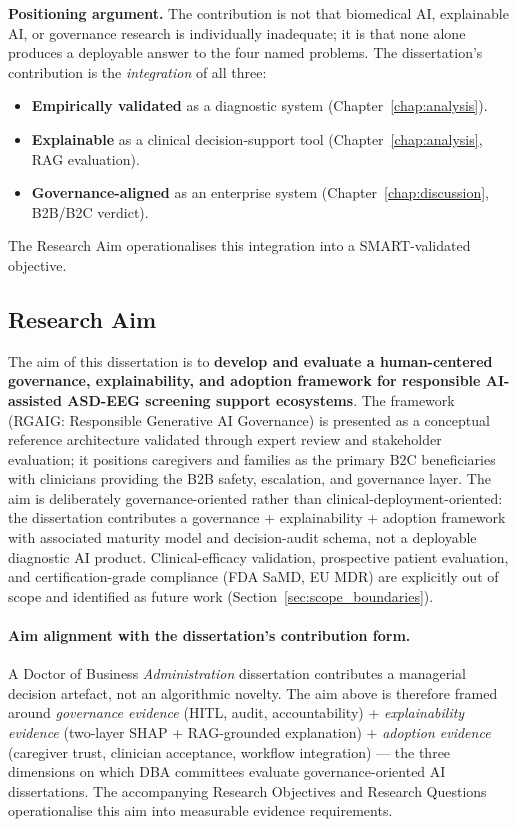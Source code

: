 \noindent\textbf{Positioning argument.} The contribution is not that biomedical AI, explainable AI, or governance research is individually inadequate; it is that none alone produces a deployable answer to the four named problems. The dissertation's contribution is the \emph{integration} of all three:
\begin{itemize}[leftmargin=*, itemsep=2pt]
    \item \textbf{Empirically validated} as a diagnostic system (Chapter~\ref{chap:analysis}).
    \item \textbf{Explainable} as a clinical decision-support tool (Chapter~\ref{chap:analysis}, RAG evaluation).
    \item \textbf{Governance-aligned} as an enterprise system (Chapter~\ref{chap:discussion}, B2B/B2C verdict).
\end{itemize}
\noindent The Research Aim operationalises this integration into a SMART-validated objective.

\subsection{Research Aim}
\label{sec:research_goal}

The aim of this dissertation is to \textbf{develop and evaluate a human-centered governance, explainability, and adoption framework for responsible AI-assisted ASD-EEG screening support ecosystems}. The framework (RGAIG: Responsible Generative AI Governance) is presented as a conceptual reference architecture validated through expert review and stakeholder evaluation; it positions caregivers and families as the primary B2C beneficiaries with clinicians providing the B2B safety, escalation, and governance layer. The aim is deliberately governance-oriented rather than clinical-deployment-oriented: the dissertation contributes a governance + explainability + adoption framework with associated maturity model and decision-audit schema, not a deployable diagnostic AI product. Clinical-efficacy validation, prospective patient evaluation, and certification-grade compliance (FDA SaMD, EU MDR) are explicitly out of scope and identified as future work (Section~\ref{sec:scope_boundaries}).

\paragraph{Aim alignment with the dissertation's contribution form.} A Doctor of Business \emph{Administration} dissertation contributes a managerial decision artefact, not an algorithmic novelty. The aim above is therefore framed around \emph{governance evidence} (HITL, audit, accountability) + \emph{explainability evidence} (two-layer SHAP + RAG-grounded explanation) + \emph{adoption evidence} (caregiver trust, clinician acceptance, workflow integration) --- the three dimensions on which DBA committees evaluate governance-oriented AI dissertations. The accompanying Research Objectives and Research Questions operationalise this aim into measurable evidence requirements.

